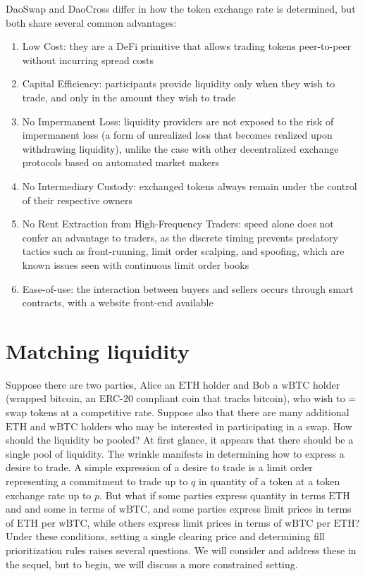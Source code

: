 \documentclass[11pt, reqno]{amsart}
\newcommand{\BTC}{\mathrm{wBTC}}
\newcommand{\ETH}{\mathrm{ETH}}
\begin{document}
DaoSwap and DaoCross differ in how the token exchange rate is determined, but
both share several common advantages:
\begin{enumerate}
	\item Low Cost:
	      they are a DeFi primitive that allows trading tokens peer-to-peer
	      without incurring spread costs
	\item Capital Efficiency:
	      participants provide liquidity only when
	      they wish to trade, and only in the amount they wish to trade
	\item No Impermanent Loss:
	      liquidity providers are not exposed to the risk of impermanent loss
	      (a form of unrealized loss that becomes realized upon withdrawing
	      liquidity), unlike the case with other decentralized exchange protocols
	      based on automated market makers
	\item No Intermediary Custody:
	      exchanged tokens always remain under the control of their respective
	      owners
	\item No Rent Extraction from High-Frequency Traders:
	      speed alone does not confer an advantage to traders, as the discrete
	      timing prevents predatory tactics such as front-running, limit order
	      scalping, and spoofing, which are known issues seen with continuous
	      limit order books
	\item Ease-of-use: the interaction between buyers and sellers occurs
	      through smart contracts, with a website front-end available
\end{enumerate}


\section{Matching liquidity}
Suppose there are two parties, Alice an $\ETH$ holder and Bob a $\BTC$ holder
(wrapped bitcoin, an ERC-20 compliant coin that tracks bitcoin), who wish to =
swap tokens at a competitive rate. Suppose also that there are many
additional $\ETH$ and $\BTC$ holders who may be interested in participating in a
swap. How should the liquidity be pooled? At first glance, it appears that
there should be a single pool of liquidity. The wrinkle manifests in determining
how to express a desire to trade. A simple expression of a desire to trade is
a limit order representing a commitment to trade up to $q$ in quantity of
a token at a token exchange rate up to $p$. But what if some parties express
quantity in terms $\ETH$ and and some in terms of $\BTC$, and some parties
express limit prices in terms of $\ETH$ per $\BTC$, while others express limit
prices in terms of $\BTC$ per $\ETH$? Under these conditions, setting a single
clearing price and determining fill prioritization rules raises several
questions. We will consider and address these in the sequel, but to begin, we
will discuss a more constrained setting.
\end{document}
